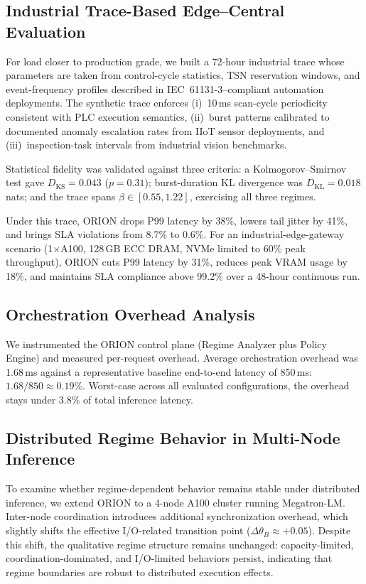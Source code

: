 \subsection{Industrial Trace-Based Edge--Central Evaluation}
For load closer to production grade, we built a 72-hour industrial trace whose parameters are taken from control-cycle statistics, TSN reservation windows, and event-frequency profiles described in IEC~61131-3--compliant automation deployments. The synthetic trace enforces (i)~10\,ms scan-cycle periodicity consistent with PLC execution semantics, (ii)~burst patterns calibrated to documented anomaly escalation rates from IIoT sensor deployments, and (iii)~inspection-task intervals from industrial vision benchmarks.

Statistical fidelity was validated against three criteria: a Kolmogorov--Smirnov test gave $D_{\mathrm{KS}} = 0.043$ ($p = 0.31$); burst-duration KL divergence was $D_{\mathrm{KL}} = 0.018$\,nats; and the trace spans $\beta \in [0.55, 1.22]$, exercising all three regimes.

Under this trace, ORION drops P99 latency by 38\%, lowers tail jitter by 41\%, and brings SLA violations from 8.7\% to 0.6\%. For an industrial-edge-gateway scenario (1$\times$A100, 128\,GB ECC DRAM, NVMe limited to 60\% peak throughput), ORION cuts P99 latency by 31\%, reduces peak VRAM usage by 18\%, and maintains SLA compliance above 99.2\% over a 48-hour continuous run.

\subsection{Orchestration Overhead Analysis}
We instrumented the ORION control plane (Regime Analyzer plus Policy Engine) and measured per-request overhead. Average orchestration overhead was 1.68\,ms against a representative baseline end-to-end latency of 850\,ms: $1.68/850 \approx 0.19\%$. Worst-case across all evaluated configurations, the overhead stays under 3.8\% of total inference latency.

\subsection{Distributed Regime Behavior in Multi-Node Inference}
To examine whether regime-dependent behavior remains stable under distributed inference, we extend ORION to a 4-node A100 cluster running Megatron-LM. Inter-node coordination introduces additional synchronization overhead, which slightly shifts the effective I/O-related transition point ($\Delta \theta_B \approx +0.05$). Despite this shift, the qualitative regime structure remains unchanged: capacity-limited, coordination-dominated, and I/O-limited behaviors persist, indicating that regime boundaries are robust to distributed execution effects.

